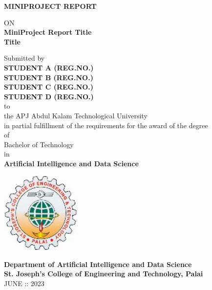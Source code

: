 \thispagestyle{empty}
\begin{center}
 
  {\Large \bf MINIPROJECT REPORT}

ON\\
  {\large \bf MiniProject Report Title\\ Title}

   \vspace*{1 cm}
   {\large Submitted by\\ { \bf STUDENT A (REG.NO.)}\\
   { \bf STUDENT B (REG.NO.)}\\
    { \bf STUDENT C (REG.NO.)}\\
   { \bf STUDENT D (REG.NO.)}}\\[-0.6mm]
  {\large to\\[-0.6mm] the APJ Abdul Kalam Technological University\\[-0.6mm] in partial fulfillment of the requirements for the award of the degree\\[-0.6mm] of\\[-0.6mm] Bachelor of Technology\\[-0.6mm] in\\[-0.6mm] {\bf Artificial Intelligence and Data Science}}
  
   \begin{center}
   \includegraphics[width=0.3\textwidth]{SJCET_logo.jpg}
   \end{center}
   \vspace*{-0.5cm}
  {\LARGE {\bf Department of Artificial Intelligence and Data Science}}\\
          [-3mm] {\large {\bf St. Joseph's College of Engineering and Technology, Palai}\\
           [1mm] JUNE :: 2023}

\end{center}
